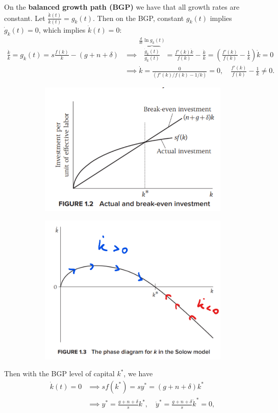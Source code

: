 \documentclass[../main.tex]{subfiles}
\begin{document}
        On the \textbf{balanced growth path (BGP)} we have that all growth rates are constant. Let $\frac{\dot k(t)}{k(t)} = g_k(t)$. Then on the BGP, constant $g_k(t)$ implies $\dot g_k(t) = 0$, which implies $\dot k(t) = 0$:
        \begin{align}
            \frac{\dot k}{k} = g_k(t)
            = s \frac{f(k)}{k} - (g+n+\delta)
            &\implies
            \overbrace{
                \frac{\dot g_k(t)}{g_k(t)}
            }^{
                \frac{d}{dt} \ln g_k(t)
            }
            = \frac{f'(k)\dot{k}}{f(k)} - \frac{\dot k}{k}
            = \left(\frac{f'(k)}{f(k)} - \frac{1}{k}\right)\dot{k}
            = 0
            \\
            &\implies
            \dot{k}
            = \frac{0}{(f'(k)/f(k) - 1/k)} = 0, \quad \frac{f'(k)}{f(k)} - \frac{1}{k} \ne 0.
        \end{align}
        
        \begin{figure}[!ht]
            \centering
            \begin{subfigure}
                \centering
                \includegraphics[width=0.4\linewidth]{subfile/attachments/1.1-actual_breakeven_investment.png}
            \end{subfigure}
            \begin{subfigure}
                \centering
                \includegraphics[width=0.4\linewidth]{subfile/attachments/1.2-phase diagram k.png}
            \end{subfigure}
        \end{figure}
        
        Then with the BGP level of capital $k^*$, we have
        \begin{align}
            \dot k(t) = 0
            &\implies
            sf(k^*) = sy^* = (g + n + \delta) k^*
            \\
            &\implies
            y^* = \frac{g+n+\delta}{s} k^*,
            \quad
            \dot y^* = \frac{g+n+\delta}{s} \dot k^* = 0,
    \end{align}
        
\end{document}
